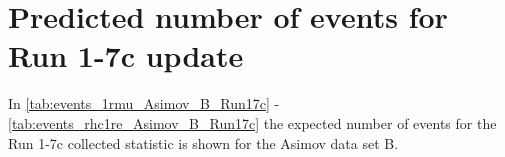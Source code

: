 
%
%

\section{Predicted number of events for Run 1-7c update}
\label{app:events_run17c}

In \cref{tab:events_1rmu_Asimov_B_Run17c} - \ref{tab:events_rhc1re_Asimov_B_Run17c} 
the expected number of events for the Run 1-7c collected statistic is shown for the Asimov data set B.






\clearpage




